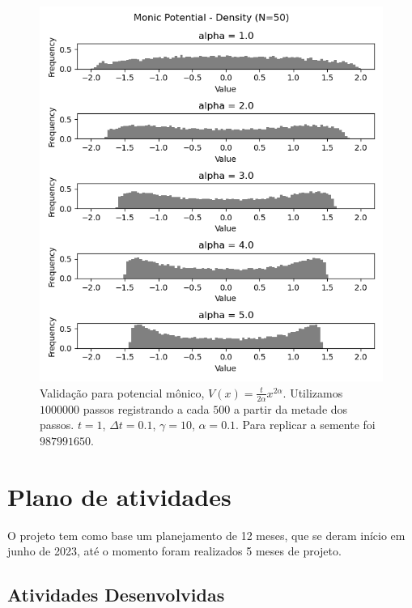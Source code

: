 \documentclass[12pt]{report}
\begin{document}
\begin{center}
	\begin{figure}
		\includegraphics[scale=0.8]{Assets/validationArticleMonic}
		\caption{Validação para potencial mônico, $V(x) = \frac{t}{2 \alpha} x^{2\alpha}$. Utilizamos $1000000$ passos registrando a cada $500$ a partir da metade dos passos. $t = 1$, $\Delta t = 0.1$, $\gamma = 10$, $\alpha = 0.1$. Para replicar a semente foi $987991650$.}
	\end{figure}
\end{center}

\chapter{Plano de atividades}\label{chp:plano}

O projeto tem como base um planejamento de 12 meses, que se deram início em junho de 2023, até o momento foram realizados 5 meses de projeto.

\section{Atividades Desenvolvidas}
\label{section:atividadesdesenvolvidas}
\end{document}
